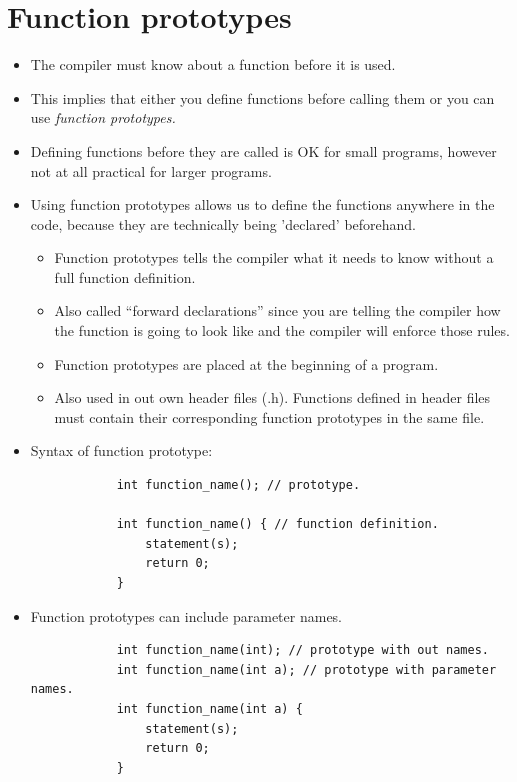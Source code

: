\section{Function prototypes}
\begin{itemize}
    \item The compiler must know about a function before it is used.
    \item This implies that either you define functions before calling them or you can use \emph{function prototypes.}
    \item Defining functions before they are called is OK for small programs, however not at all practical for larger programs.
    \item Using function prototypes allows us to define the functions anywhere in the code, because they are technically being 'declared' beforehand.
        \begin{itemize}
            \item Function prototypes tells the compiler what it needs to know without a full function definition.
            \item Also called ``forward declarations'' since you are telling the compiler how the function is going to look like and the compiler will enforce those rules.
            \item Function prototypes are placed at the beginning of a program.
            \item Also used in out own header files (.h). Functions defined in header files must contain their corresponding function prototypes in the same file.
        \end{itemize}
    
    \item Syntax of function prototype:
        \begin{verbatim}
            int function_name(); // prototype.
        
            int function_name() { // function definition.
                statement(s);
                return 0;
            }
        \end{verbatim}
    
    \item Function prototypes can include parameter names.
        \begin{verbatim}
            int function_name(int); // prototype with out names.
            int function_name(int a); // prototype with parameter names.
            int function_name(int a) {
                statement(s);
                return 0;
            }
        \end{verbatim}
    

\end{itemize}
